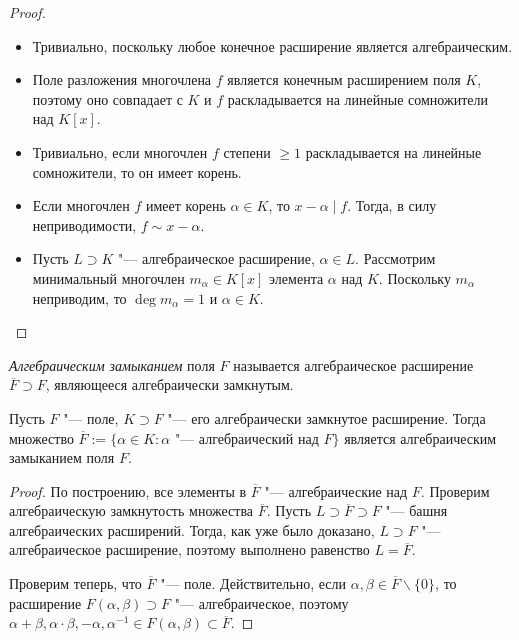 \begin{proof}~
	\begin{itemize}
		\item{}Тривиально, поскольку любое конечное расширение является алгебраическим.
		\item{}Поле разложения многочлена $f$ является конечным расширением поля $K$, поэтому оно совпадает с $K$ и $f$ раскладывается на линейные сомножители над $K[x]$.
		\item{}Тривиально, если многочлен $f$ степени $\ge 1$ раскладывается на линейные сомножители, то он имеет корень.
		\item{}Если многочлен $f$ имеет корень $\alpha \in K$, то $x - \alpha \mid f$. Тогда, в силу неприводимости, $f \sim x - \alpha$.
		\item{}Пусть $L \supset K$ "--- алгебраическое расширение, $\alpha \in L$. Рассмотрим минимальный многочлен $m_\alpha \in K[x]$ элемента $\alpha$ над $K$. Поскольку $m_\alpha$ неприводим, то $\deg{m_\alpha} = 1$ и $\alpha \in K$.\qedhere
	\end{itemize}
\end{proof}

\begin{definition}
	\textit{Алгебраическим замыканием} поля $F$ называется алгебраическое расширение $\overline{F} \supset F$, являющееся алгебраически замкнутым.
\end{definition}

\begin{proposition}
	Пусть $F$ "--- поле, $K \supset F$ "--- его алгебраически замкнутое расширение. Тогда множество $\overline{F} := \{\alpha \in K: \alpha\text{ "--- алгебраический над }F\}$ является алгебраическим замыканием поля $F$.
\end{proposition}

\begin{proof}
	По построению, все элементы в $\overline{F}$ "--- алгебраические над $F$. Проверим алгебраическую замкнутость множества $\overline{F}$. Пусть $L \supset \overline{F} \supset F$ "--- башня алгебраических расширений. Тогда, как уже было доказано, $L \supset F$ "--- алгебраическое расширение, поэтому выполнено равенство $L = \overline{F}$.
	
	Проверим теперь, что $\overline{F}$ "--- поле. Действительно, если $\alpha, \beta \in \overline{F} \backslash \{0\}$, то расширение $F(\alpha, \beta) \supset F$ "--- алгебраическое, поэтому $\alpha + \beta, \alpha \cdot \beta, -\alpha, \alpha^{-1} \in F(\alpha, \beta) \subset \overline{F}$.
\end{proof}

